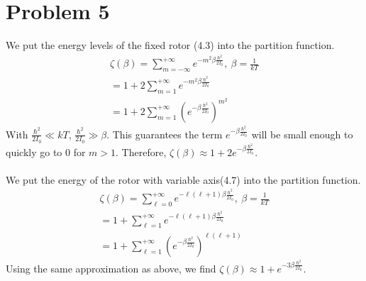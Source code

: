 \documentclass[a4paper,10pt]{article}
\numberwithin{equation}{section}
\begin{document}
\section{Problem 5}
We put the energy levels of the fixed rotor (4.3) into the partition function.
\begin{gather}
 \zeta(\beta)=\sum_{m=-\infty }^{+\infty }e^{-m^2 \beta \frac{\hbar^2}{2I_0}},\ \beta=\frac{1}{kT}\\
 =1+2\sum_{m=1 }^{+\infty }e^{-m^2 \beta \frac{\hbar^2}{2I_0}}\\
 =1+2\sum_{m=1 }^{+\infty }(e^{-\beta \frac{\hbar^2}{2I_0}})^{m^2}
\end{gather}
With $\frac{\hbar ^2}{2I_0} \ll kT$, $\frac{\hbar ^2}{2I_0} \gg \beta$. 
This guarantees the term $e^{-\beta \frac{\hbar^2}{2I_0}}$ will be small enough to quickly go to 0 for $m>1$.
Therefore, $\zeta(\beta)\approx1+2e^{-\beta \frac{\hbar^2}{2I_0}} $.
\\
\\
We put the energy of the rotor with variable axis(4.7) into the partition function.
\begin{gather}
 \zeta(\beta)=\sum_{\ell=0 }^{+\infty }e^{-\ell(\ell+1) \beta \frac{\hbar^2}{2I_0}},\ \beta=\frac{1}{kT}\\
 =1+\sum_{\ell=1 }^{+\infty }e^{-\ell(\ell+1) \beta \frac{\hbar^2}{2I_0}}\\
  =1+\sum_{\ell=1 }^{+\infty }(e^{-\beta \frac{\hbar^2}{2I_0}})^{\ell(\ell+1)}
\end{gather}
Using the same approximation as above, we find $\zeta(\beta)\approx1+e^{-3\beta \frac{\hbar^2}{2I_0}} $.

\clearpage
\end{document}
